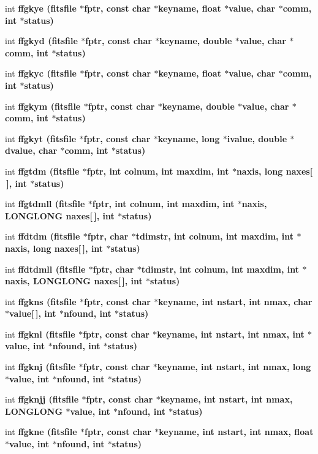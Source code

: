 \begin{CompactItemize}
\item 
int \bf{ffgkye} (\bf{fitsfile} $\ast$fptr, const char $\ast$keyname, float $\ast$value, char $\ast$comm, int $\ast$status)
\item 
int \bf{ffgkyd} (\bf{fitsfile} $\ast$fptr, const char $\ast$keyname, double $\ast$value, char $\ast$comm, int $\ast$status)
\item 
int \bf{ffgkyc} (\bf{fitsfile} $\ast$fptr, const char $\ast$keyname, float $\ast$value, char $\ast$comm, int $\ast$status)
\item 
int \bf{ffgkym} (\bf{fitsfile} $\ast$fptr, const char $\ast$keyname, double $\ast$value, char $\ast$comm, int $\ast$status)
\item 
int \bf{ffgkyt} (\bf{fitsfile} $\ast$fptr, const char $\ast$keyname, long $\ast$ivalue, double $\ast$dvalue, char $\ast$comm, int $\ast$status)
\item 
int \bf{ffgtdm} (\bf{fitsfile} $\ast$fptr, int colnum, int maxdim, int $\ast$naxis, long naxes[$\,$], int $\ast$status)
\item 
int \bf{ffgtdmll} (\bf{fitsfile} $\ast$fptr, int colnum, int maxdim, int $\ast$naxis, \bf{LONGLONG} naxes[$\,$], int $\ast$status)
\item 
int \bf{ffdtdm} (\bf{fitsfile} $\ast$fptr, char $\ast$tdimstr, int colnum, int maxdim, int $\ast$naxis, long naxes[$\,$], int $\ast$status)
\item 
int \bf{ffdtdmll} (\bf{fitsfile} $\ast$fptr, char $\ast$tdimstr, int colnum, int maxdim, int $\ast$naxis, \bf{LONGLONG} naxes[$\,$], int $\ast$status)
\item 
int \bf{ffgkns} (\bf{fitsfile} $\ast$fptr, const char $\ast$keyname, int nstart, int nmax, char $\ast$value[$\,$], int $\ast$nfound, int $\ast$status)
\item 
int \bf{ffgknl} (\bf{fitsfile} $\ast$fptr, const char $\ast$keyname, int nstart, int nmax, int $\ast$value, int $\ast$nfound, int $\ast$status)
\item 
int \bf{ffgknj} (\bf{fitsfile} $\ast$fptr, const char $\ast$keyname, int nstart, int nmax, long $\ast$value, int $\ast$nfound, int $\ast$status)
\item 
int \bf{ffgknjj} (\bf{fitsfile} $\ast$fptr, const char $\ast$keyname, int nstart, int nmax, \bf{LONGLONG} $\ast$value, int $\ast$nfound, int $\ast$status)
\item 
int \bf{ffgkne} (\bf{fitsfile} $\ast$fptr, const char $\ast$keyname, int nstart, int nmax, float $\ast$value, int $\ast$nfound, int $\ast$status)
\item 

\end{CompactItemize}

